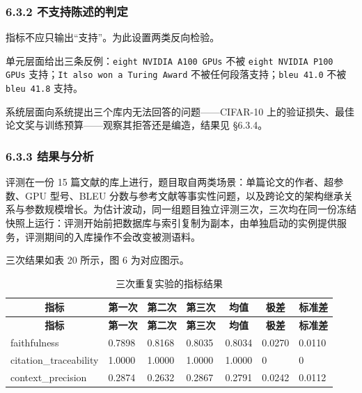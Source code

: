 \documentclass[UTF8,fontset=windows,zihao=5,a4paper]{ctexart}
\begin{document}
\subsubsection*{6.3.2 不支持陈述的判定}
指标不应只输出“支持”。为此设置两类反向检验。

单元层面给出三条反例：\texttt{eight NVIDIA A100 GPUs} 不被 \texttt{eight NVIDIA P100 GPUs} 支持；\texttt{It also won a Turing Award} 不被任何段落支持；\texttt{bleu 41.0} 不被 \texttt{bleu 41.8} 支持。

系统层面向系统提出三个库内无法回答的问题——CIFAR-10 上的验证损失、最佳论文奖与训练预算——观察其拒答还是编造，结果见 §6.3.4。

\subsubsection*{6.3.3 结果与分析}
评测在一份 15 篇文献的库上进行，题目取自两类场景：单篇论文的作者、超参数、GPU 型号、BLEU 分数与参考文献等事实性问题，以及跨论文的架构继承关系与参数规模增长。为估计波动，同一组题目独立评测三次，三次均在同一份冻结快照上运行：评测开始前把数据库与索引复制为副本，由单独启动的实例提供服务，评测期间的入库操作不会改变被测语料。

三次结果如表 20 所示，图 6 为对应图示。

\begin{longtable}{@{}p{}p{}p{}p{}p{}p{}p{}@{}}
\caption{三次重复实验的指标结果}\\
\toprule
\multicolumn{1}{c}{\textbf{指标}} & \multicolumn{1}{c}{\textbf{第一次}} & \multicolumn{1}{c}{\textbf{第二次}} & \multicolumn{1}{c}{\textbf{第三次}} & \multicolumn{1}{c}{\textbf{均值}} & \multicolumn{1}{c}{\textbf{极差}} & \multicolumn{1}{c}{\textbf{标准差}} \\
\midrule
\endfirsthead
\toprule
\multicolumn{1}{c}{\textbf{指标}} & \multicolumn{1}{c}{\textbf{第一次}} & \multicolumn{1}{c}{\textbf{第二次}} & \multicolumn{1}{c}{\textbf{第三次}} & \multicolumn{1}{c}{\textbf{均值}} & \multicolumn{1}{c}{\textbf{极差}} & \multicolumn{1}{c}{\textbf{标准差}} \\
\midrule
\endhead
\bottomrule
\endfoot
faithfulness & 0.7898 & 0.8168 & 0.8035 & 0.8034 & 0.0270 & 0.0110 \\
citation\_\allowbreak{}traceability & 1.0000 & 1.0000 & 1.0000 & 1.0000 & 0 & 0 \\
context\_\allowbreak{}precision & 0.2874 & 0.2632 & 0.2867 & 0.2791 & 0.0242 & 0.0112 \\
\end{longtable}
\end{document}

